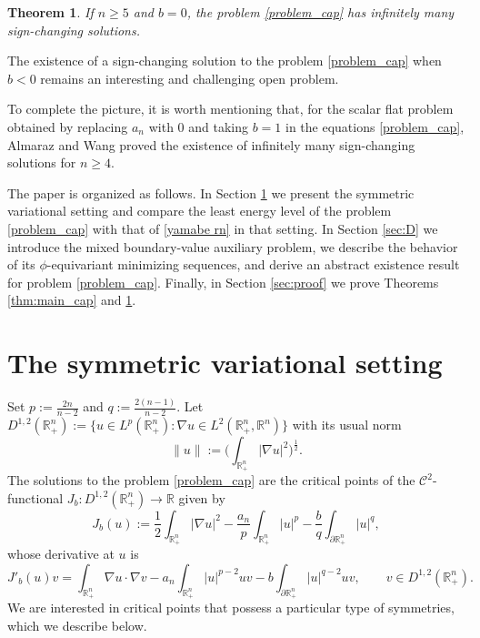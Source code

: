 \documentclass[reqno,11pt,oneside]{amsart}
\newtheorem{theorem}{Theorem}[section]
\numberwithin{equation}{section}
\def\r{\mathbb{R}}
\def\rn{\mathbb{R}^n}
\def\hn{\mathbb{R}^n_+}
\def\ihn{\int_{\hn}}
\def\idhn{\int_{\partial\hn}}
\def\cC{\mathcal{C}}
\begin{document}
\begin{theorem} \label{thm:main_n=6}
If $n\geq 5$ and $b=0$, the problem \eqref{problem_cap} has infinitely many sign-changing solutions.
\end{theorem}

The existence of a sign-changing solution to the problem \eqref{problem_cap} when $b < 0$ remains an interesting and challenging open problem.

To complete the picture, it is worth mentioning that, for the scalar flat problem obtained by replacing $a_n$ with $0$ and taking $b=1$ in the equations \eqref{problem_cap}, Almaraz and Wang \cite{aw} proved the existence of infinitely many sign-changing solutions for $n\geq 4$.

The paper is organized as follows. In Section \ref{sec:setting} we present the symmetric variational setting and compare the least energy level of the problem \eqref{problem_cap} with that of \eqref{yamabe rn} in that setting. In Section \ref{sec:D} we introduce the mixed boundary-value auxiliary problem, we describe the behavior of its $\phi$-equivariant minimizing sequences, and derive an abstract existence result for problem \eqref{problem_cap}. Finally, in Section \ref{sec:proof} we prove Theorems \ref{thm:main_cap} and \ref{thm:main_n=6}.

\section{The symmetric variational setting}
\label{sec:setting}

Set $p:=\frac{2n}{n-2}$ and $q:=\frac{2(n-1)}{n-2}$. Let $D^{1,2}(\hn):=\{u\in L^p(\hn):\nabla u\in L^2(\hn,\rn)\}$ with its usual norm
\begin{equation}\label{eq:norm}
\|u\|:=\Big(\ihn|\nabla u|^2\Big)^\frac{1}{2}.
\end{equation}
The solutions to the problem \eqref{problem_cap} are the critical points of the $\cC^2$-functional $J_b:D^{1,2}(\hn)\to\r$ given by
\begin{equation}\label{eq:J}
J_b(u):=\frac{1}{2}\ihn|\nabla u|^2 - \frac{a_n}{p}\ihn|u|^p - \frac{b}{q}\idhn |u|^q,
\end{equation}
whose derivative at $u$ is
\begin{equation}\label{eq:derivative}
J'_b(u)v=\ihn\nabla u\cdot\nabla v - a_n\ihn |u|^{p-2}uv - b\idhn |u|^{q-2}uv,\qquad v\in D^{1,2}(\hn).
\end{equation}
We are interested in critical points that possess a particular type of symmetries, which we describe below.
\end{document}
